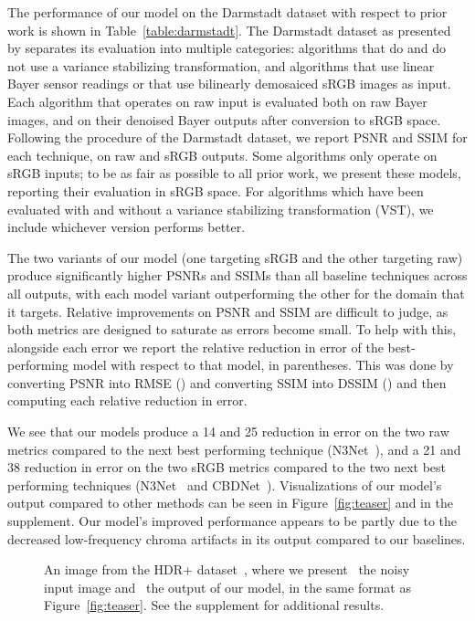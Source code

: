 \documentclass[10pt,twocolumn,letterpaper]{article}
\begin{document}
The performance of our model on the Darmstadt dataset with respect to prior work is shown in Table~\ref{table:darmstadt}. The Darmstadt dataset as presented by \cite{plotz2017cvpr} separates its evaluation into multiple categories: algorithms that do and do not use a variance stabilizing transformation, and algorithms that use linear Bayer sensor readings or that use bilinearly demosaiced sRGB images as input. Each algorithm that operates on raw input is evaluated both on raw Bayer images, and on their denoised Bayer outputs after conversion to sRGB space. Following the procedure of the Darmstadt dataset, we report PSNR and SSIM for each technique, on raw and sRGB outputs. Some algorithms only operate on sRGB inputs; to be as fair as possible to all prior work, we present these models, reporting their evaluation in sRGB space. For algorithms which have been evaluated with and without a variance stabilizing transformation (VST), we include whichever version performs better.

The two variants of our model (one targeting sRGB and the other targeting raw) produce significantly higher PSNRs and SSIMs than all baseline techniques across all outputs, with each model variant outperforming the other for the domain that it targets.
Relative improvements on PSNR and SSIM are difficult to judge, as both metrics are designed to saturate as errors become small. To help with this, alongside each error we report the relative reduction in error of the best-performing model with respect to that model, in parentheses. This was done by converting PSNR into RMSE () and converting SSIM into DSSIM () and then computing each relative reduction in error.

We see that our models produce a 14 and 25 reduction in error on the two raw metrics compared to the next best performing technique (N3Net~\cite{NNN}), and a 21 and 38 reduction in error on the two sRGB metrics compared to the two next best performing techniques (N3Net~\cite{NNN} and CBDNet~\cite{CBDnet}). Visualizations of our model's output compared to other methods can be seen in Figure~\ref{fig:teaser} and in the supplement.
Our model's improved performance appears to be partly due to the decreased low-frequency chroma artifacts in its output compared to our baselines.

\begin{figure}[t]
\begin{center}
\end{center}
  \caption{An image from the HDR+ dataset~\cite{hasinoff2016burst}, where we present ~the noisy input image and ~the output of our model, in the same format as Figure~\ref{fig:teaser}.
  See the supplement for additional results.}
\label{fig:hdrp}
\end{figure}
\end{document}
